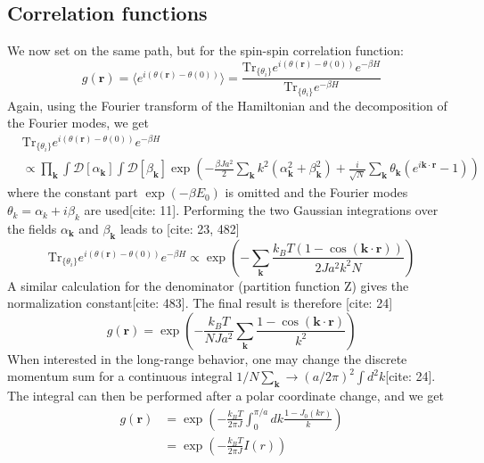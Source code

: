 \documentclass[11pt]{article}
\begin{document}
\subsection{Correlation functions}

We now set on the same path, but for the spin-spin correlation function:
\begin{equation}
g(\mathbf{r}) = \langle e^{i(\theta(\mathbf{r}) - \theta(0))} \rangle = \frac{\text{Tr}_{\{\theta_i\}} e^{i(\theta(\mathbf{r}) - \theta(0))} e^{-\beta H}}{\text{Tr}_{\{\theta_i\}} e^{-\beta H}} \label{eq:corr_def}
\end{equation}
Again, using the Fourier transform of the Hamiltonian and the decomposition of the Fourier modes, we get
\begin{align}
&\text{Tr}_{\{\theta_i\}} e^{i(\theta(\mathbf{r})-\theta(0))} e^{-\beta H} \nonumber \\
&\propto \prod_{\mathbf{k}} \int \mathcal{D}[\alpha_{\mathbf{k}}] \int \mathcal{D}[\beta_{\mathbf{k}}] \exp\left( -\frac{\beta J a^2}{2} \sum_{\mathbf{k}} k^2 (\alpha_{\mathbf{k}}^2 + \beta_{\mathbf{k}}^2) + \frac{i}{\sqrt{N}} \sum_{\mathbf{k}} \theta_{\mathbf{k}}(e^{i \mathbf{k} \cdot \mathbf{r}} - 1) \right) \label{eq:corr_num_calc}
\end{align}
where the constant part $\exp(-\beta E_0)$ is omitted and the Fourier modes $\theta_k = \alpha_k + i \beta_k$ are used[cite: 11]. Performing the two Gaussian integrations over the fields $\alpha_{\mathbf{k}}$ and $\beta_{\mathbf{k}}$ leads to [cite: 23, 482]
\begin{equation}
\text{Tr}_{\{\theta_i\}} e^{i(\theta(\mathbf{r})-\theta(0))} e^{-\beta H} \propto \exp\left( -\sum_{\mathbf{k}} \frac{k_B T (1 - \cos(\mathbf{k} \cdot \mathbf{r}))}{2 J a^2 k^2 N} \right) \label{eq:corr_num_res} %
\end{equation}
A similar calculation for the denominator (partition function Z) gives the normalization constant[cite: 483]. The final result is therefore [cite: 24]
\begin{equation}
g(\mathbf{r}) = \exp\left( -\frac{k_B T}{N J a^2} \sum_{\mathbf{k}} \frac{1 - \cos(\mathbf{k} \cdot \mathbf{r})}{k^2} \right) \label{eq:corr_discrete}
\end{equation}
When interested in the long-range behavior, one may change the discrete momentum sum for a continuous integral $1/N \sum_{\mathbf{k}} \to (a/2\pi)^2 \int d^2k$[cite: 24]. The integral can then be performed after a polar coordinate change, and we get
\begin{align}
g(\mathbf{r}) &= \exp\left( -\frac{k_B T}{2\pi J} \int_0^{\pi/a} dk \frac{1 - J_0(kr)}{k} \right) \label{eq:corr_integral1} \\
             &= \exp\left( -\frac{k_B T}{2\pi J} I(r) \right) \label{eq:corr_integral2}
\end{align}
\end{document}

